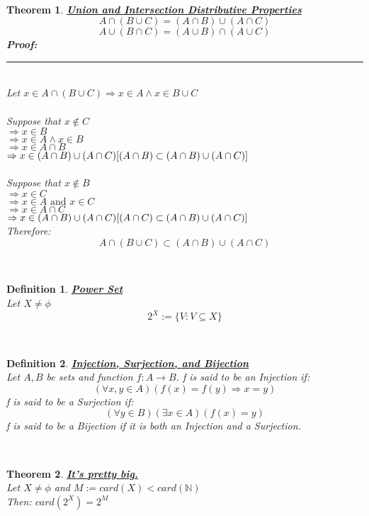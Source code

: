 \documentclass[12pt]{extarticle}
\theoremstyle{plain}
\newtheorem{thm}{Theorem}[section]
\theoremstyle{plain}
\theoremstyle{plain}
\theoremstyle{Definition}
\newtheorem{def.}{Definition}[section]
\theoremstyle{Definition}
\theoremstyle{plain}
\theoremstyle{plain}
\newcommand{\cut}[0]{\noindent\framebox[\linewidth]{\rule{\linewidth}{2pt}}\\}
\newcommand{\prof}[0]{	\noindent \textbf{Proof:} \rule{500pt}{2pt} \\ }
\begin{document}
\cut
\begin{thm} \underline{\textbf{Union and Intersection Distributive Properties}} \\ 
	$$A \cap (B \cup C) = (A \cap B) \cup (A \cap C)$$ 	
	$$A \cup (B \cap C) = (A \cup B) \cap (A \cup C)$$
	\prof
	Let $x \in A \cap (B \cup C) \Rightarrow x \in A \land x \in B \cup C$ \\ \\
	Suppose that $x \not \in C$ \\
	$\Rightarrow x \in B$ \\ 
	$\Rightarrow x \in A \land x \in B$ \\ 
	$\Rightarrow x \in A \cap B$ \\ 
	$\Rightarrow x \in (A \cap B) \cup (A \cap C) \hfill [(A \cap B) \subset (A \cap B) \cup (A \cap C)]$ \\ \\
	Suppose that $x \not \in B$ \\
	$\Rightarrow x \in C$ \\ 
	$\Rightarrow x \in A \text{ and } x \in C$ \\ 
	$\Rightarrow x \in A \cap C$ \\ 
	$\Rightarrow x \in (A \cap B) \cup (A \cap C) \hfill [(A \cap C) \subset (A \cap B) \cup (A \cap C)]$ \\
	Therefore: \\ 
	$$A \cap (B \cup C) \subset (A \cap B) \cup (A \cap C)$$ 	
\end{thm}
\cut
\begin{def.} \underline{\textbf{Power Set}} \\ 
	Let $X \not = \phi$ \\ 
	$$2^X := \{V : V \subseteq X\}$$
\end{def.}
\cut
\begin{def.} \underline{\textbf{Injection, Surjection, and Bijection}} \\
	Let $A,B$ be sets and  function $f : A \to B$.
	f is said to be an Injection if: \\ 
	$$(\forall x,y \in A)(f(x) = f(y) \Rightarrow x = y)$$
	f is said to be a Surjection if: \\ 
	$$(\forall y \in B)(\exists x \in A)(f(x) = y)$$
	f is said to be a Bijection if it is both an Injection and a Surjection.  
\end{def.}
\cut
\begin{thm} \underline{\textbf{It's pretty big.}} \\ 
	Let $X \not = \phi$ and $M := card(X) < card(\mathbb{N})$ \\
	Then: $card(2^X) = 2^M$ 
\end{thm}
\end{document}

